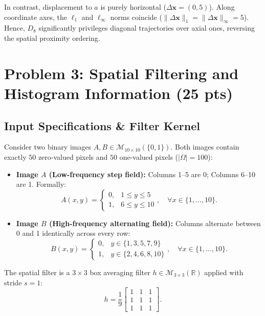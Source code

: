 \documentclass[11pt,a4paper]{article}
\begin{document}
In contrast, displacement to $a$ is purely horizontal ($\Delta \mathbf{x} = (0, 5)$). Along coordinate axes, the $\ell_1$ and $\ell_\infty$ norms coincide ($\|\Delta \mathbf{x}\|_1 = \|\Delta \mathbf{x}\|_\infty = 5$). Hence, $D_8$ significantly privileges diagonal trajectories over axial ones, reversing the spatial proximity ordering.

\section{Problem 3: Spatial Filtering and Histogram Information (25 pts)}

\subsection{Input Specifications \& Filter Kernel}
Consider two binary images $A, B \in \mathcal{M}_{10 \times 10}(\{0, 1\})$. Both images contain exactly $50$ zero-valued pixels and $50$ one-valued pixels ($|\Omega| = 100$):
\begin{itemize}
    \item \textbf{Image $A$ (Low-frequency step field):} Columns 1--5 are 0; Columns 6--10 are 1. Formally:
    \begin{equation}
    A(x, y) = \begin{cases} 0, & 1 \le y \le 5 \\ 1, & 6 \le y \le 10 \end{cases}, \quad \forall x \in \{1, \dots, 10\}.
    \end{equation}
    \item \textbf{Image $B$ (High-frequency alternating field):} Columns alternate between 0 and 1 identically across every row:
    \begin{equation}
    B(x, y) = \begin{cases} 0, & y \in \{1, 3, 5, 7, 9\} \\ 1, & y \in \{2, 4, 6, 8, 10\} \end{cases}, \quad \forall x \in \{1, \dots, 10\}.
    \end{equation}
\end{itemize}
The spatial filter is a $3 \times 3$ box averaging filter $h \in \mathcal{M}_{3 \times 3}(\mathbb{R})$ applied with stride $s = 1$:
\begin{equation}
h = \frac{1}{9}\begin{bmatrix} 1 & 1 & 1 \\ 1 & 1 & 1 \\ 1 & 1 & 1 \end{bmatrix}.
\end{equation}
\end{document}
